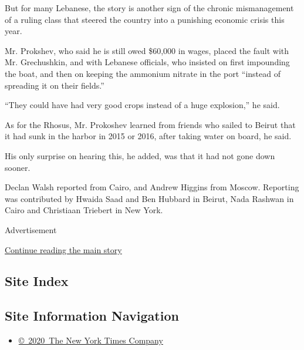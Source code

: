 But for many Lebanese, the story is another sign of the chronic
mismanagement of a ruling class that steered the country into a
punishing economic crisis this year.

Mr. Prokshev, who said he is still owed \$60,000 in wages, placed the
fault with Mr. Grechushkin, and with Lebanese officials, who insisted on
first impounding the boat, and then on keeping the ammonium nitrate in
the port ``instead of spreading it on their fields.''

``They could have had very good crops instead of a huge explosion,'' he
said.

As for the Rhosus, Mr. Prokoshev learned from friends who sailed to
Beirut that it had sunk in the harbor in 2015 or 2016, after taking
water on board, he said.

His only surprise on hearing this, he added, was that it had not gone
down sooner.

Declan Walsh reported from Cairo, and Andrew Higgins from Moscow.
Reporting was contributed by Hwaida Saad and Ben Hubbard in Beirut, Nada
Rashwan in Cairo and Christiaan Triebert in New York.

Advertisement

\protect\hyperlink{after-bottom}{Continue reading the main story}

\hypertarget{site-index}{%
\subsection{Site Index}\label{site-index}}

\hypertarget{site-information-navigation}{%
\subsection{Site Information
Navigation}\label{site-information-navigation}}

\begin{itemize}
\tightlist
\item
  \href{https://help.nytimes.com/hc/en-us/articles/115014792127-Copyright-notice}{©~2020~The
  New York Times Company}
\end{itemize}

